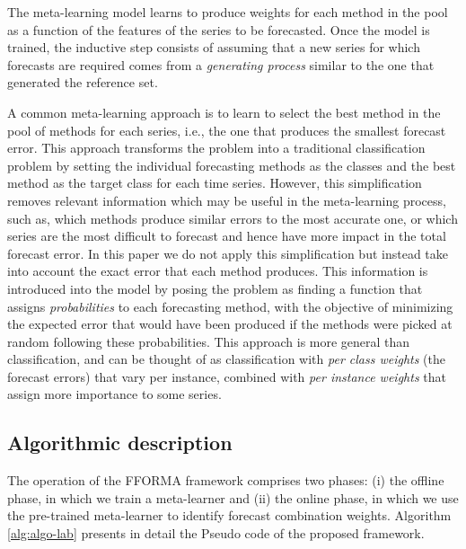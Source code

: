 \documentclass[11pt,a4paper,]{article}
\theoremstyle{definition}
\theoremstyle{definition}
\theoremstyle{definition}
\theoremstyle{remark}
\begin{document}
The meta-learning model learns to produce weights for each method in the
pool as a function of the features of the series to be forecasted. Once
the model is trained, the inductive step consists of assuming that a new
series for which forecasts are required comes from a \emph{generating
process} similar to the one that generated the reference set.

A common meta-learning approach is to learn to select the best method in
the pool of methods for each series, i.e., the one that produces the
smallest forecast error. This approach transforms the problem into a
traditional classification problem by setting the individual forecasting
methods as the classes and the best method as the target class for each
time series. However, this simplification removes relevant information
which may be useful in the meta-learning process, such as, which methods
produce similar errors to the most accurate one, or which series are the
most difficult to forecast and hence have more impact in the total
forecast error. In this paper we do not apply this simplification but
instead take into account the exact error that each method produces.
This information is introduced into the model by posing the problem as
finding a function that assigns \emph{probabilities} to each forecasting
method, with the objective of minimizing the expected error that would
have been produced if the methods were picked at random following these
probabilities. This approach is more general than classification, and
can be thought of as classification with \emph{per class weights} (the
forecast errors) that vary per instance, combined with \emph{per
instance weights} that assign more importance to some series.

\subsection{Algorithmic description}\label{algorithmic-description}

The operation of the FFORMA framework comprises two phases: (i) the
offline phase, in which we train a meta-learner and (ii) the online
phase, in which we use the pre-trained meta-learner to identify forecast
combination weights. Algorithm \ref{alg:algo-lab} presents in detail the
Pseudo code of the proposed framework.
\end{document}
